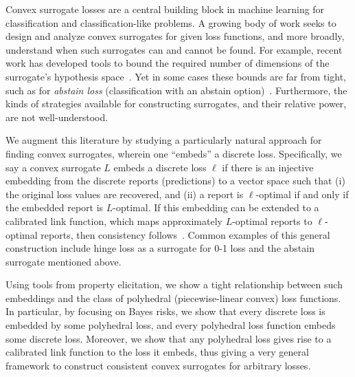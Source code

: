 \documentclass[12pt]{article}
\newcommand{\Comments}{1}
\newcommand{\mynote}[2]{\ifnum\Comments=1\textcolor{#1}{#2}\fi}
\newcommand{\raf}[1]{\mynote{green}{[RF: #1]}}
\newcommand{\reals}{\mathbb{R}}
\newcommand{\R}{\mathcal{R}}
\begin{document}
%

Convex surrogate losses are a central building block in machine learning for classification and classification-like problems.
A growing body of work seeks to design and analyze convex surrogates for given loss functions, and more broadly, understand when such surrogates can and cannot be found.
For example, recent work has developed tools to bound the required number of dimensions of the surrogate's hypothesis space~\cite{frongillo2015elicitation,  ramaswamy2016convex}.
Yet in some cases these bounds are far from tight, such as for \emph{abstain loss} (classification with an abstain option)~\cite{bartlett2008classification, yuan2010classification, ramaswamy2016convex, ramaswamy2018consistent, zhang2018reject}.
Furthermore, the kinds of strategies available for constructing surrogates, and their relative power, are not well-understood.

We augment this literature by studying a particularly natural approach for finding convex surrogates, wherein one ``embeds'' a discrete loss.
Specifically, we say a convex surrogate $L$ embeds a discrete loss $\ell$ if there is an injective embedding from the discrete reports (predictions) to a vector space such that (i) the original loss values are recovered, and (ii) a report is $\ell$-optimal if and only if the embedded report is $L$-optimal.
If this embedding can be extended to a calibrated link function, which maps approximately $L$-optimal reports to $\ell$-optimal reports, then consistency follows~\cite{agarwal2015consistent}.
Common examples of this general construction include hinge loss as a surrogate for 0-1 loss and the abstain surrogate mentioned above.

Using tools from property elicitation, we show a tight relationship between such embeddings and the class of polyhedral (piecewise-linear convex) loss functions.
In particular, by focusing on Bayes risks, we show that every discrete loss is embedded by some polyhedral loss, and every polyhedral loss function embeds some discrete loss.
Moreover, we show that any polyhedral loss gives rise to a calibrated link function to the loss it embeds,
thus giving a very general framework to construct consistent convex surrogates for arbitrary losses.
\end{document}
